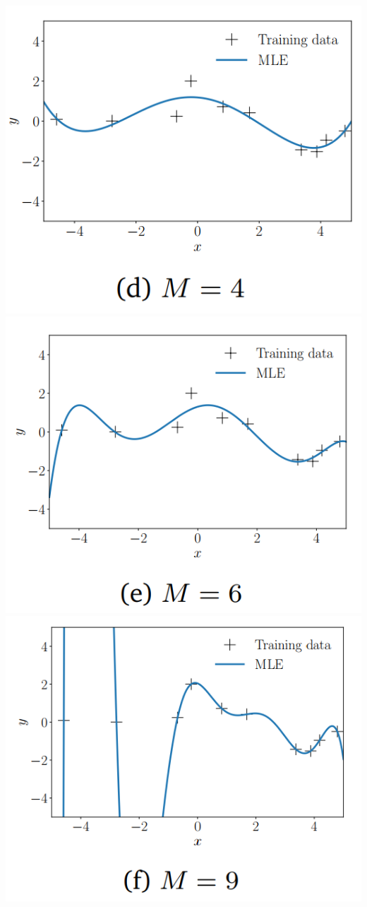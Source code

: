 \documentclass[12pt]{article}
\numberwithin{equation}{section}
\begin{document}
{\includegraphics[scale=0.48]{graph8} 
\includegraphics[scale=0.48]{graph9} 
\includegraphics[scale=0.48]{graph10}\\
}
\end{document}
